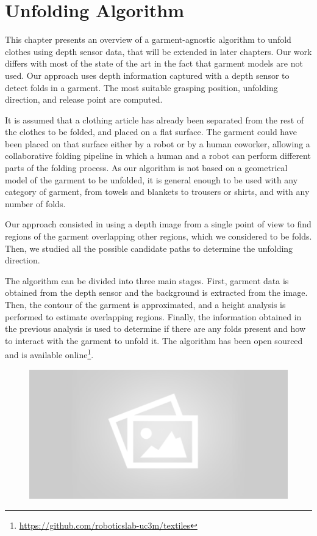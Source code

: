\chapter{Unfolding Algorithm}
\label{architecture}

This chapter presents an overview of a garment-agnostic algorithm to unfold clothes using depth sensor data, that will be extended in later chapters. Our work differs with most of the state of the art in the fact that garment models are not used. Our approach uses depth information captured with a depth sensor to detect folds in a garment. The most suitable grasping position, unfolding direction, and release point are computed.

It is assumed that a clothing article has already been separated from the rest of the clothes to be folded, and placed on a flat surface. The garment could have been placed on that surface either by a robot or by a human coworker, allowing a collaborative folding pipeline in which a human and a robot can perform different parts of the folding process.
As our algorithm is not based on a geometrical model of the garment to be unfolded, it is general enough to be used with any category of garment, from towels and blankets to trousers or shirts, and with any number of folds. 

Our approach consisted in using a depth image from a single point of view to find regions of the garment overlapping other regions, which we considered to be folds. Then, we studied all the possible candidate paths to determine the unfolding direction. 

The algorithm can be divided into three main stages. First, garment data is obtained from the depth sensor and the background is extracted from the image. Then, the contour of the garment is approximated, and a height analysis is performed to estimate overlapping regions. Finally, the information obtained in the previous analysis is used to determine if there are any folds present and how to interact with the garment to unfold it. The algorithm has been open sourced and is available online\footnote{\url{https://github.com/roboticslab-uc3m/textiles}}.

\begin{figure}[thpb]
    \centering
    \includegraphics[width=0.8
    \textwidth]{figures/placeholder2.png}
    \caption{}
    \label{fig:pipeline_block_diagram}
\end{figure}

